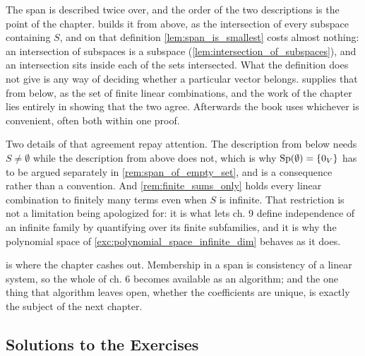 \begin{ainote}
The span is described twice over, and the order of the two descriptions is the
point of the chapter.  builds it from above, as the intersection
of every subspace containing $S$, and on that definition
\cref{lem:span_is_smallest} costs almost nothing: an intersection of subspaces
is a subspace (\cref{lem:intersection_of_subspaces}), and an intersection sits
inside each of the sets intersected. What the definition does not give is any
way of deciding whether a particular vector belongs.
 supplies that from below, as the set of
finite linear combinations, and the work of the chapter lies entirely in showing
that the two agree. Afterwards the book uses whichever is convenient, often both
within one proof.

Two details of that agreement repay attention. The description from below needs
$S \ne \emptyset$ while the description from above does not, which is why
$\operatorname{Sp}(\emptyset) = \{0_V\}$ has to be argued separately in
\cref{rem:span_of_empty_set}, and is a consequence rather than a convention.
And \cref{rem:finite_sums_only} holds every linear combination to finitely many
terms even when $S$ is infinite. That restriction is not a limitation being
apologized for: it is what lets ch. 9 define independence of an infinite family
by quantifying over its finite subfamilies, and it is why the polynomial space
of \cref{exc:polynomial_space_infinite_dim} behaves as it does.

 is where the chapter cashes out. Membership in a
span is consistency of a linear system, so the whole of ch. 6 becomes available
as an algorithm; and the one thing that algorithm leaves open, whether the
coefficients are unique, is exactly the subject of the next chapter.
\end{ainote}

\subsection{Solutions to the Exercises}
\label{sec:solutions_span}

